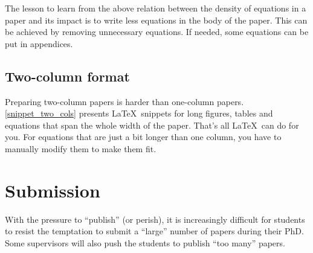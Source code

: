 \documentclass[authoryear,3p,times,preprint,review,fleqn]{elsarticle}
\numberwithin{equation}{section}
\theoremstyle{remark}
\begin{document}
The lesson to learn from the above relation between the density of equations in a paper and its impact is to write less equations in the body of the paper. This can be achieved by removing unnecessary equations. If needed, some equations can be put in appendices.

\subsection{Two-column format}

Preparing two-column papers is harder than one-column papers. \cref{snippet_two_cols} presents \LaTeX\ snippets for long figures, tables and equations that span the whole width of the paper. That's all \LaTeX\ can do for you. For equations that are just a bit longer than one column, you have to manually modify them to make them fit.

\begin{figure}[!h]
  \begin{snippetlatex}[caption={Writing two-column papers using \LaTeX.},label={snippet_two_cols},framerule=1pt,tabsize=3]
    \usepackage{mathtools, cuted} %

    \begin{figure}[!h]
    \end{figure}

    \begin{table}[!h]
    \end{table}
   
    \begin{strip}
    \end{strip}
  \end{snippetlatex}
\end{figure}




\section{Submission}

With the pressure to “publish” (or perish), it is increasingly difficult for students to resist the temptation to submit a “large” number of papers during their PhD. Some supervisors will also push the students to publish “too many” papers. 
\end{document}

